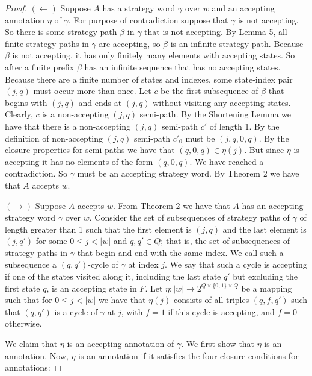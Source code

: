 \documentclass{lmcs}
\theoremstyle{definition}
\DeclareMathOperator{\?}{?}
\begin{document}
\begin{proof}

$(\leftarrow)$ Suppose $A$ has a strategy word $\gamma$ over $w$ and an accepting annotation $\eta$ of $\gamma$. For purpose of contradiction suppose that $\gamma$ is not accepting. So there is some strategy path $\beta$ in $\gamma$ that is not accepting. By Lemma 5, all finite strategy paths in $\gamma$ are accepting, so $\beta$ is an infinite strategy path. Because $\beta$ is not accepting, it has only finitely many elements with accepting states. So after a finite prefix $\beta$ has an infinite sequence that has no accepting states. Because there are a finite number of states and indexes, some state-index pair $(j,q)$ must occur more than once. Let $c$ be the first subsequence of $\beta$ that begins with $(j,q)$ and ends at $(j,q)$ without visiting any accepting states. Clearly, $c$ is a non-accepting $(j,q)$ semi-path. By the Shortening Lemma we have that there is a non-accepting $(j,q)$ semi-path $c'$ of length 1. By the definition of non-accepting $(j,q)$ semi-path $c'_0$ must be $(j,q,0,q)$. By the closure properties for semi-paths we have that $(q,0,q) \in \eta(j)$. But since $\eta$ is accepting it has no elements of the form $(q,0,q)$. We have reached a contradiction. So $\gamma$ must be an accepting strategy word. By Theorem 2 we have that $A$ accepts $w$.

$(\rightarrow)$ Suppose $A$ accepts $w$. From Theorem 2 we have that $A$ has an accepting strategy word $\gamma$ over $w$. Consider the set of subsequences of strategy paths of $\gamma$ of length greater than 1 such that the first element is $(j,q)$ and the last element is $(j,q')$ for some $0 \leq j < |w|$ and $q,q' \in Q$; that is, the set of subsequences of strategy paths in $\gamma$ that begin and end with the same index. We call such a subsequence a $(q,q')$-cycle of $\gamma$ at index $j$. We say that such a cycle is accepting if one of the states visited along it, including the last state $q'$ but excluding the first state $q$, is an accepting state in $F$.
Let $\eta : |w| \rightarrow 2^{Q \times \{0,1\} \times Q}$ be a mapping such that for $0\leq j < |w|$ we have that $\eta(j)$ consists of all triples $(q,f,q')$ such that $(q,q')$ is a cycle of $\gamma$ at $j$, with $f=1$ if this cycle is accepting, and $f=0$ otherwise.

We claim that $\eta$ is an accepting annotation of $\gamma$. We first show that $\eta$ is an annotation. Now, $\eta$ is an annotation if it satisfies the four closure conditions for annotations:


\end{proof}
\end{document}
